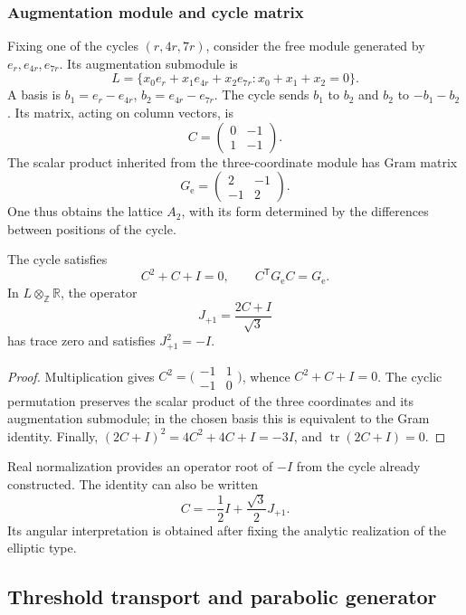 \subsubsection{Augmentation module and cycle matrix}

Fixing one of the cycles \((r,4r,7r)\), consider the free module
generated by \(e_r,e_{4r},e_{7r}\). Its augmentation submodule is
\[
 L=\{x_0e_r+x_1e_{4r}+x_2e_{7r}:x_0+x_1+x_2=0\}.
\]
A basis is \(b_1=e_r-e_{4r}\), \(b_2=e_{4r}-e_{7r}\). The cycle
sends \(b_1\) to \(b_2\) and \(b_2\) to \(-b_1-b_2\). Its matrix,
acting on column vectors, is
\[
 C=\begin{pmatrix}0&-1\\1&-1\end{pmatrix}.
\]
The scalar product inherited from the three-coordinate module has Gram
matrix
\[
 G_{\mathrm e}=\begin{pmatrix}2&-1\\-1&2\end{pmatrix}.
\]
One thus obtains the lattice \(A_2\), with its form determined by the
differences between positions of the cycle.

\begin{proposicion}
\label{eul:prop:eliptico}
The cycle satisfies
\[
 C^2+C+I=0,\qquad C^\mathsf TG_{\mathrm e}C=G_{\mathrm e}.
\]
In \(L\otimes_{\mathbb Z}\mathbb R\), the operator
\[
 J_{+1}=\frac{2C+I}{\sqrt3}
\]
has trace zero and satisfies \(J_{+1}^2=-I\).
\end{proposicion}
\begin{proof}
Multiplication gives
\(C^2=\bigl(\begin{smallmatrix}-1&1\\-1&0\end{smallmatrix}\bigr)\),
whence \(C^2+C+I=0\). The cyclic permutation preserves the
scalar product of the three coordinates and its augmentation submodule;
in the chosen basis this is equivalent to the Gram identity. Finally,
\((2C+I)^2=4C^2+4C+I=-3I\), and
\(\operatorname{tr}(2C+I)=0\).
\end{proof}

Real normalization provides an operator root of \(-I\) from
the cycle already constructed. The identity can also be written
\[
 C=-\frac12I+\frac{\sqrt3}{2}J_{+1}.
\]
Its angular interpretation is obtained after fixing the analytic
realization of the elliptic type.

\subsection{Threshold transport and parabolic generator}
\label{eul:parabolico}

